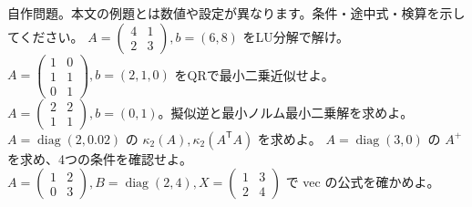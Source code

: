\documentclass[11pt]{article}
\begin{document}
自作問題。本文の例題とは数値や設定が異なります。条件・途中式・検算を示してください。
\problem[LUと連立式]
$A=\begin{pmatrix}4&1\\2&3\end{pmatrix},b=(6,8)$ をLU分解で解け。
\workspace{45mm}
\problem[QR最小二乗]
$A=\begin{pmatrix}1&0\\1&1\\0&1\end{pmatrix},b=(2,1,0)$ をQRで最小二乗近似せよ。
\workspace{45mm}
\newpage
\problem[階数1の擬似逆]
$A=\begin{pmatrix}2&2\\1&1\end{pmatrix},b=(0,1)$。擬似逆と最小ノルム最小二乗解を求めよ。
\workspace{45mm}
\problem[条件数]
$A=\operatorname{diag}(2,0.02)$ の $\kappa_2(A),\kappa_2(A^{\mathsf T}A)$ を求めよ。
\workspace{45mm}
\newpage
{}
$A=\operatorname{diag}(3,0)$ の $A^+$ を求め、4つの条件を確認せよ。
\workspace{45mm}
\problem[列ベクトル化]
$A=\begin{pmatrix}1&2\\0&3\end{pmatrix},B=\operatorname{diag}(2,4),X=\begin{pmatrix}1&3\\2&4\end{pmatrix}$ で vec の公式を確かめよ。
\workspace{45mm}
\end{document}
